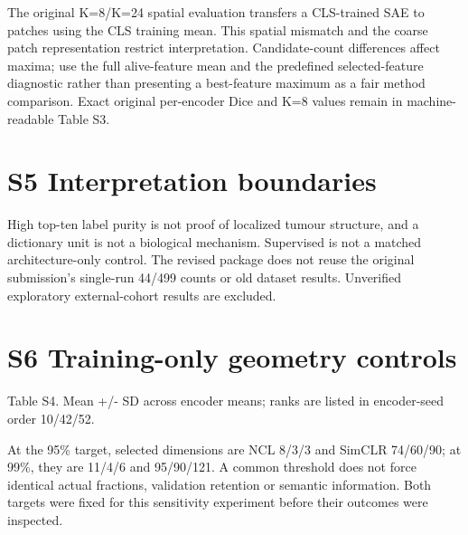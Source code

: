 \documentclass[10pt]{article}
\begin{document}
The original K=8/K=24 spatial evaluation transfers a CLS-trained SAE to patches using the CLS training mean. This spatial mismatch and the coarse patch representation restrict interpretation. Candidate-count differences affect maxima; use the full alive-feature mean and the predefined selected-feature diagnostic rather than presenting a best-feature maximum as a fair method comparison. Exact original per-encoder Dice and K=8 values remain in machine-readable Table S3.

\section*{S5  Interpretation boundaries}
High top-ten label purity is not proof of localized tumour structure, and a dictionary unit is not a biological mechanism. Supervised is not a matched architecture-only control. The revised package does not reuse the original submission's single-run 44/499 counts or old dataset results. Unverified exploratory external-cohort results are excluded.

\clearpage
\section*{S6  Training-only geometry controls}
\begin{center}
\par\small Table S4. Mean +/- SD across encoder means; ranks are listed in encoder-seed order 10/42/52.
\end{center}
At the 95\% target, selected dimensions are NCL 8/3/3 and SimCLR 74/60/90; at 99\%, they are 11/4/6 and 95/90/121. A common threshold does not force identical actual fractions, validation retention or semantic information. Both targets were fixed for this sensitivity experiment before their outcomes were inspected.
\end{document}
